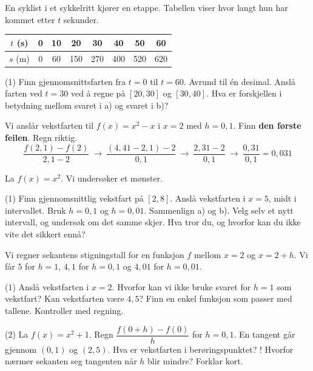 En syklist i et sykkelritt kjører en etappe. Tabellen viser hvor langt hun har kommet etter $t$ sekunder.
\begin{center}
\begin{tabular}{c|ccccccc}
$t$ (s) & 0 & 10 & 20 & 30 & 40 & 50 & 60\\ \hline
$s$ (m) & 0 & 60 & 150 & 270 & 400 & 520 & 620\\
\end{tabular}
\end{center}
\begin{tasks}(1)
  \task Finn gjennomsnittsfarten fra $t = 0$ til $t = 60$. Avrund til én desimal.
  \task Anslå farten ved $t = 30$ ved å regne på $[20, 30]$ og $[30, 40]$.
  \task Hva er forskjellen i betydning mellom svaret i a) og svaret i b)?
\end{tasks}

Vi anslår vekstfarten til $f(x) = x^2 - x$ i $x = 2$ med $h = 0,1$. Finn \textbf{den første feilen}. Regn riktig.
\[ \frac{f(2,1) - f(2)}{2,1 - 2} \ \longrightarrow\ \frac{(4,41 - 2,1) - 2}{0,1} \ \longrightarrow\ \frac{2,31 - 2}{0,1} \ \longrightarrow\ \frac{0,31}{0,1} = 0,031 \]


La $f(x) = x^2$. Vi undersøker et mønster.
\begin{tasks}(1)
  \task Finn gjennomsnittlig vekstfart på $[2, 8]$.
  \task Anslå vekstfarten i $x = 5$, midt i intervallet. Bruk $h = 0,1$ og $h = 0,01$.
  \task Sammenlign a) og b). Velg selv et nytt intervall, og undersøk om det samme skjer. Hva tror du, og hvorfor kan du ikke vite det sikkert ennå?
\end{tasks}

Vi regner sekantens stigningstall for en funksjon $f$ mellom $x = 2$ og $x = 2 + h$. Vi får $5$ for $h = 1$, $4,1$ for $h = 0,1$ og $4,01$ for $h = 0,01$.
\begin{tasks}(1)
  \task Anslå vekstfarten i $x = 2$.
  \task Hvorfor kan vi ikke bruke svaret for $h = 1$ som vekstfart? Kan vekstfarten være $4,5$?
  \task Finn en enkel funksjon som passer med tallene. Kontroller med regning.
\end{tasks}

\begin{sjekk}
\begin{tasks}(2)
  \task La $f(x) = x^2 + 1$. Regn $\dfrac{f(0 + h) - f(0)}{h}$ for $h = 0,1$.
  \task En tangent går gjennom $(0, 1)$ og $(2, 5)$. Hva er vekstfarten i berøringspunktet?
  \task! Hvorfor nærmer sekanten seg tangenten når $h$ blir mindre? Forklar kort.
\end{tasks}
\end{sjekk}
